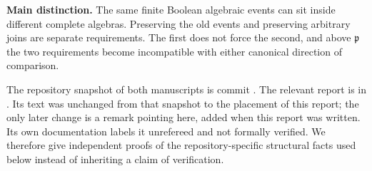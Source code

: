 \documentclass[11pt,letterpaper]{article}
\theoremstyle{definition}
\theoremstyle{remark}
\newcommand{\cp}{\mathfrak p}
\begin{document}
\begin{resultbox}
\textbf{Main distinction.} The same finite Boolean algebraic events can
sit inside different complete algebras. Preserving the old events and
preserving arbitrary joins are separate requirements. The first does not
force the second, and above $\cp$ the two requirements become
incompatible with either canonical direction of comparison.
\end{resultbox}

The repository snapshot of both manuscripts is commit
. The relevant report is
in 
.
Its text was unchanged from that snapshot to the placement of this
report; the only later change is a remark pointing here, added when this
report was written. Its own documentation labels it unrefereed and not
formally verified. We therefore give independent proofs of the
repository-specific structural facts used below instead of inheriting a
claim of verification.

\end{document}
